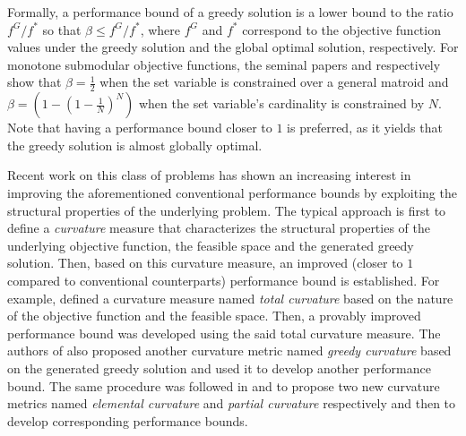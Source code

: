 \documentclass[conference]{IEEEtran}
\begin{document}

Formally, a performance bound of a greedy solution is a lower bound to the ratio $f^G/f^*$ so that $\beta \leq f^{G}/f^{\ast}$, where $f^{G}$ and $f^{\ast}$ correspond to the objective function values under the greedy solution and the global optimal solution, respectively. For monotone submodular objective functions, the seminal papers \cite{Fisher1978} and \cite{Nemhauser1978} respectively show that $\beta = \frac{1}{2}$ when the set variable is constrained over a general matroid and $\beta = (1-(1-\frac{1}{N})^N)$  when the set variable's cardinality is constrained by $N$. Note that having a performance bound closer to $1$ is preferred, as it yields that the greedy solution is almost globally optimal.

Recent work on this class of problems has shown an increasing interest in improving the aforementioned conventional performance bounds by exploiting the structural properties of the underlying problem. The typical approach is first to define a \emph{curvature} measure that characterizes the structural properties of the underlying objective function, the feasible space and the generated greedy solution. Then, based on this curvature measure, an improved (closer to $1$ compared to conventional counterparts) performance bound is established. For example, \cite{Conforti1984} defined a curvature measure named \emph{total curvature} based on the nature of the objective function and the feasible space. Then, a provably improved performance bound was  developed using the said total curvature measure. The authors of \cite{Conforti1984} also proposed another curvature metric named \emph{greedy curvature} based on the generated greedy solution and used it to develop another performance bound. The same procedure was followed in \cite{Wang2016} and \cite{Liu2018} to propose two new curvature metrics named \emph{elemental curvature} and \emph{partial curvature} respectively and then to develop corresponding performance bounds. 
\end{document}
